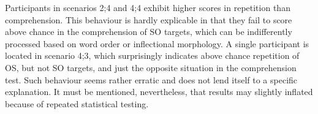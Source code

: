 \begin{table}
    \caption{Learners in scenario 4}
    \label{tab:06:9}
\end{table}

Participants in scenarios 2;4 and 4;4 exhibit higher scores in repetition than comprehension. This behaviour is hardly explicable in that they fail to score above chance in the comprehension of SO targets, which can be indifferently processed based on word order or inflectional morphology. A single participant is located in scenario 4;3, which surprisingly indicates above chance repetition of OS, but not SO targets, and just the opposite situation in the comprehension test. Such behaviour seems rather erratic and does not lend itself to a specific explanation. It must be mentioned, nevertheless, that results may slightly inflated because of repeated statistical testing. 

